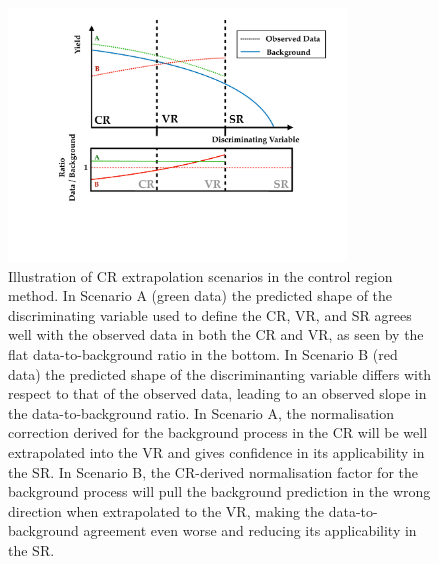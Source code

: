 \begin{figure}[!htb]
    \begin{center}
        \includegraphics[width=0.8\textwidth]{figures/common_ana/crvr_extrap_shape}
        \caption{
            Illustration of CR extrapolation scenarios in the control region method.
            In Scenario A (green data) the predicted shape of the discriminating variable
            used to define the CR, VR, and SR agrees well with the observed data
            in both the CR and VR, as seen by the flat data-to-background ratio in the bottom.
            In Scenario B (red data) the predicted shape of the discriminanting variable
            differs with respect to that of the observed data, leading to an observed
            slope in the data-to-background ratio.
            In Scenario A, the normalisation correction derived for the background process
            in the CR will be well extrapolated into the VR and gives confidence in its applicability
            in the SR.
            In Scenario B, the CR-derived normalisation factor for the background process
            will pull the background prediction in the wrong direction when extrapolated
            to the VR, making the data-to-background agreement even worse and reducing
            its applicability in the SR.
        }
        \label{fig:crvr_extrap_shape}
    \end{center}
\end{figure}

\FloatBarrier
